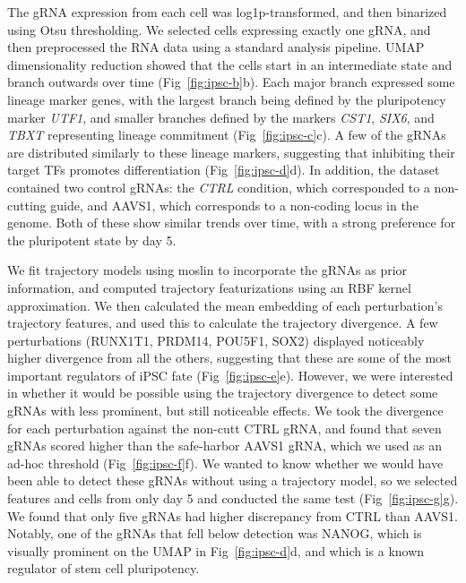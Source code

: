 The gRNA expression from each cell was log1p-transformed, and then binarized using Otsu thresholding. We selected cells expressing exactly one gRNA, and then preprocessed the RNA data using a standard analysis pipeline. UMAP dimensionality reduction showed that the cells start in an intermediate state and branch outwards over time (Fig~\ref{fig:ipsc-b}b). Each major branch expressed some lineage marker genes, with the largest branch being defined by the pluripotency marker \textit{UTF1}, and smaller branches defined by the markers \textit{CST1}, \textit{SIX6}, and \textit{TBXT} representing lineage commitment (Fig~\ref{fig:ipsc-c}c). A few of the gRNAs are distributed similarly to these lineage markers, suggesting that inhibiting their target TFs promotes differentiation (Fig~\ref{fig:ipsc-d}d). In addition, the dataset contained two control gRNAs: the \textit{CTRL} condition, which corresponded to a non-cutting guide, and AAVS1, which corresponds to a non-coding locus in the genome. Both of these show similar trends over time, with a strong preference for the pluripotent state by day 5.

We fit trajectory models using moslin to incorporate the gRNAs as prior information, and computed trajectory featurizations using an RBF kernel approximation. We then calculated the mean embedding of each perturbation's trajectory features, and used this to calculate the trajectory divergence. A few perturbations (RUNX1T1, PRDM14, POU5F1, SOX2) displayed noticeably higher divergence from all the others, suggesting that these are some of the most important regulators of iPSC fate (Fig~\ref{fig:ipsc-e}e). However, we were interested in whether it would be possible using the trajectory divergence to detect some gRNAs with less prominent, but still noticeable effects. We took the divergence for each perturbation against the non-cutt CTRL gRNA, and found that seven gRNAs scored higher than the safe-harbor AAVS1 gRNA, which we used as an ad-hoc threshold (Fig~\ref{fig:ipsc-f}f). We wanted to know whether we would have been able to detect these gRNAs without using a trajectory model, so we selected features and cells from only day 5 and conducted the same test (Fig~\ref{fig:ipsc-g}g). We found that only five gRNAs had higher discrepancy from CTRL than AAVS1. Notably, one of the gRNAs that fell below detection was NANOG, which is visually prominent on the UMAP in Fig~\ref{fig:ipsc-d}d, and which is a known regulator of stem cell pluripotency.
